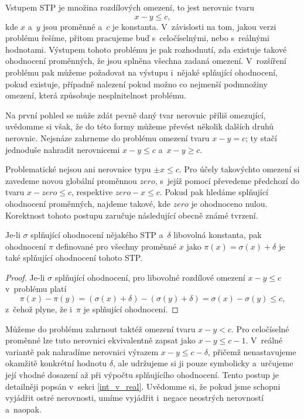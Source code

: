 Vstupem STP je množina rozdílových omezení, to jest nerovnic tvaru $$x - y \leq c,$$ kde $x$ a~$y$ jsou proměnné a~$c$ je konstanta. V~závislosti na tom, jakou verzi problému řešíme, přitom pracujeme buď s~celočíselnými, nebo s~reálnými hodnotami. Výstupem tohoto problému je pak rozhodnutí, zda existuje takové ohodnocení proměnných, že jsou splněna všechna zadaná omezení. V~rozšíření problému pak můžeme požadovat na výstupu i~nějaké splňující ohodnocení, pokud existuje, případně nalezení pokud možno co nejmenší podmnožiny omezení, která způsobuje nesplnitelnost problému.

Na první pohled se může zdát pevně daný tvar nerovnic příliš omezující, uvědomme si však, že do této formy můžeme převést několik dalších druhů nerovnic. Nejsnáze zahrneme do problému omezení tvaru $x - y = c$; ty stačí jednoduše nahradit nerovnicemi $x - y \leq c$ a~$x - y \geq c$.

Problematické nejsou ani nerovnice typu $\pm x \leq c$. Pro účely takovýchto omezení si zavedeme novou globální proměnnou $zero$, s~jejíž pomocí převedeme předchozí do tvaru $x - zero \leq c$, respektive $zero - x \leq c$. Pokud pak hledáme splňující ohodnocení proměnných, najdeme takové, kde $zero$ je ohodnoceno nulou. Korektnost tohoto postupu zaručuje následující obecně známé tvrzení.

\begin{tvrz}
	Je-li $\sigma$ splňující ohodnocení nějakého STP a~$\delta$ libovolná konstanta, pak ohodnocení $\pi$ definované pro všechny proměnné $x$ jako $\pi(x) = \sigma(x) + \delta$ je také splňující ohodnocení tohoto STP.
\end{tvrz}
\begin{proof}
	Je-li $\sigma$ splňující ohodnocení, pro libovolné rozdílové omezení $x-y \leq c$ v~problému platí $$\pi(x) - \pi(y) = (\sigma(x) + \delta) - (\sigma(y) + \delta) = \sigma(x) - \sigma(y) \leq c,$$ z~čehož plyne, že i~$\pi$ je splňující ohodnocení.
\end{proof}

Můžeme do problému zahrnout taktéž omezení tvaru $x - y < c$. Pro celočíselné proměnné lze tuto nerovnici ekvivalentně zapsat jako $x - y \leq c-1$. V~reálné variantě pak nahradíme nerovnici výrazem $x - y \leq c - \delta$, přičemž nenastavujeme okamžitě konkrétní hodnotu $\delta$, ale udržujeme si ji pouze symbolicky a~určujeme její vhodné dosazení až při výpočtu splňujícího ohodnocení. Tento postup je detailněji popsán v~sekci \ref{int_v_real}. Uvědomme si, že pokud jsme schopni vyjádřit ostré nerovnosti, umíme vyjádřit i~negace neostrých nerovností a~naopak.

